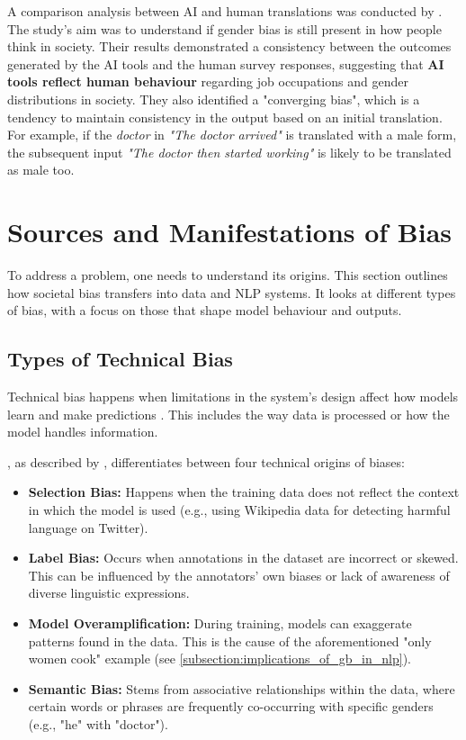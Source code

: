 A comparison analysis between AI and human translations was conducted by \citet{smacchiaDoesAIReflect2024}. The study's aim was to understand if gender bias is still present in how people think in society. Their results demonstrated a consistency between the outcomes generated by the AI tools and the human survey responses, suggesting that \textbf{AI tools reflect human behaviour} regarding job occupations and gender distributions in society. They also identified a "converging bias", which is a tendency to maintain consistency in the output based on an initial translation. For example, if the \textit{doctor} in \textit{"The doctor arrived"} is translated with a male form, the subsequent input \textit{"The doctor then started working"} is likely to be translated as male too.


\section{Sources and Manifestations of Bias}

To address a problem, one needs to understand its origins. This section outlines how societal bias transfers into data and NLP systems. It looks at different types of bias, with a focus on those that shape model behaviour and outputs.

\subsection{Types of Technical Bias}
Technical bias happens when limitations in the system's design affect how models learn and make predictions \citep{stanczakSurveyGenderBias2021}. This includes the way data is processed or how the model handles information.

\citet{shahPredictiveBiasesNatural2020}, as described by \citet{ullmannGenderBiasMachine2022}, differentiates between four technical origins of biases:

\begin{itemize}
    \item \textbf{Selection Bias:} Happens when the training data does not reflect the context in which the model is used (e.g., using Wikipedia data for detecting harmful language on Twitter).
    
    \item \textbf{Label Bias:} Occurs when annotations in the dataset are incorrect or skewed. This can be influenced by the annotators' own biases or lack of awareness of diverse linguistic expressions.

    \item \textbf{Model Overamplification:} During training, models can exaggerate patterns found in the data. This is the cause of the aforementioned "only women cook" example (see \autoref{subsection:implications_of_gb_in_nlp}).

    \item \textbf{Semantic Bias:} Stems from associative relationships within the data, where certain words or phrases are frequently co-occurring with specific genders (e.g., "he" with "doctor").
\end{itemize}

